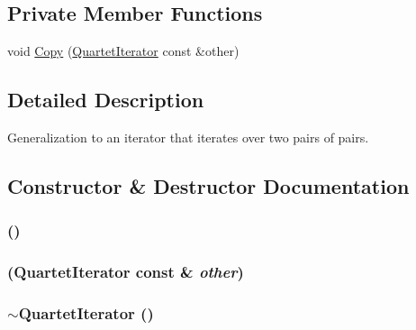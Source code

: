 \subsection*{Private Member Functions}
\begin{DoxyCompactItemize}
\item 
void \hyperlink{classJKBuilder_1_1QuartetIterator_a1cc9d53b063e002ead95abb45f05f0c3}{Copy} (\hyperlink{classJKBuilder_1_1QuartetIterator}{QuartetIterator} const \&other)
\end{DoxyCompactItemize}


\subsection{Detailed Description}
Generalization to an iterator that iterates over two pairs of pairs. 

\subsection{Constructor \& Destructor Documentation}
\hypertarget{classJKBuilder_1_1QuartetIterator_a07d00ea07b0f26457f2552be518080ba}{
\subsubsection[{QuartetIterator}]{ ()}}
\label{classJKBuilder_1_1QuartetIterator_a07d00ea07b0f26457f2552be518080ba}
\hypertarget{classJKBuilder_1_1QuartetIterator_af4c9d6672dc0009768dd792e7f98ae7d}{
\subsubsection[{QuartetIterator}]{ ({\bf QuartetIterator} const \& {\em other})}}
\label{classJKBuilder_1_1QuartetIterator_af4c9d6672dc0009768dd792e7f98ae7d}
\hypertarget{classJKBuilder_1_1QuartetIterator_a45af941f47c9b8051f2ed69d47157e12}{
\subsubsection[{$\sim$QuartetIterator}]{\setlength{\rightskip}{0pt plus 5cm}$\sim${\bf QuartetIterator} ()}}
\label{classJKBuilder_1_1QuartetIterator_a45af941f47c9b8051f2ed69d47157e12}


